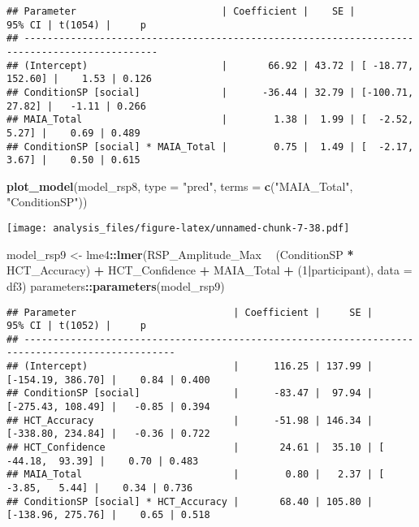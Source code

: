 \documentclass[
]{article}
\newenvironment{Shaded}{\begin{snugshade}}{\end{snugshade}}
\newcommand{\DataTypeTok}[1]{\textcolor[rgb]{0.13,0.29,0.53}{#1}}
\newcommand{\DecValTok}[1]{\textcolor[rgb]{0.00,0.00,0.81}{#1}}
\newcommand{\KeywordTok}[1]{\textcolor[rgb]{0.13,0.29,0.53}{\textbf{#1}}}
\newcommand{\NormalTok}[1]{#1}
\newcommand{\OperatorTok}[1]{\textcolor[rgb]{0.81,0.36,0.00}{\textbf{#1}}}
\newcommand{\StringTok}[1]{\textcolor[rgb]{0.31,0.60,0.02}{#1}}
\begin{document}
\begin{verbatim}
## Parameter                         | Coefficient |    SE |            95% CI | t(1054) |     p
## ---------------------------------------------------------------------------------------------
## (Intercept)                       |       66.92 | 43.72 | [ -18.77, 152.60] |    1.53 | 0.126
## ConditionSP [social]              |      -36.44 | 32.79 | [-100.71,  27.82] |   -1.11 | 0.266
## MAIA_Total                        |        1.38 |  1.99 | [  -2.52,   5.27] |    0.69 | 0.489
## ConditionSP [social] * MAIA_Total |        0.75 |  1.49 | [  -2.17,   3.67] |    0.50 | 0.615
\end{verbatim}

\begin{Shaded}
\begin{Highlighting}[]
\KeywordTok{plot_model}\NormalTok{(model_rsp8, }\DataTypeTok{type =} \StringTok{"pred"}\NormalTok{, }\DataTypeTok{terms =} \KeywordTok{c}\NormalTok{(}\StringTok{"MAIA_Total"}\NormalTok{, }\StringTok{"ConditionSP"}\NormalTok{))}
\end{Highlighting}
\end{Shaded}

\texttt{[image: analysis\_files/figure-latex/unnamed-chunk-7-38.pdf]}

\begin{Shaded}
\begin{Highlighting}[]
\NormalTok{model_rsp9 <-}\StringTok{ }\NormalTok{lme4}\OperatorTok{::}\KeywordTok{lmer}\NormalTok{(RSP_Amplitude_Max }\OperatorTok{~}\StringTok{ }\NormalTok{(ConditionSP }\OperatorTok{*}\StringTok{ }\NormalTok{HCT_Accuracy) }\OperatorTok{+}\StringTok{ }\NormalTok{HCT_Confidence }\OperatorTok{+}\StringTok{ }\NormalTok{MAIA_Total }\OperatorTok{+}\StringTok{ }\NormalTok{(}\DecValTok{1}\OperatorTok{|}\NormalTok{participant), }\DataTypeTok{data =}\NormalTok{ df3)}
\NormalTok{parameters}\OperatorTok{::}\KeywordTok{parameters}\NormalTok{(model_rsp9)}
\end{Highlighting}
\end{Shaded}

\begin{verbatim}
## Parameter                           | Coefficient |     SE |            95% CI | t(1052) |     p
## ------------------------------------------------------------------------------------------------
## (Intercept)                         |      116.25 | 137.99 | [-154.19, 386.70] |    0.84 | 0.400
## ConditionSP [social]                |      -83.47 |  97.94 | [-275.43, 108.49] |   -0.85 | 0.394
## HCT_Accuracy                        |      -51.98 | 146.34 | [-338.80, 234.84] |   -0.36 | 0.722
## HCT_Confidence                      |       24.61 |  35.10 | [ -44.18,  93.39] |    0.70 | 0.483
## MAIA_Total                          |        0.80 |   2.37 | [  -3.85,   5.44] |    0.34 | 0.736
## ConditionSP [social] * HCT_Accuracy |       68.40 | 105.80 | [-138.96, 275.76] |    0.65 | 0.518
\end{verbatim}
\end{document}
